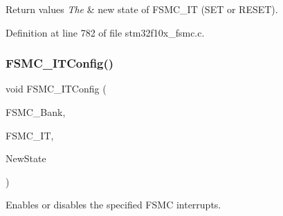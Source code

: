 \begin{DoxyRetVals}{Return values}
{\em The} & new state of F\+S\+M\+C\+\_\+\+IT (S\+ET or R\+E\+S\+ET). \\
\hline
\end{DoxyRetVals}


Definition at line 782 of file stm32f10x\+\_\+fsmc.\+c.

\mbox{\label{group___f_s_m_c___exported___functions_ga217027ae3cd213b9076b6a1be197064c}} 
\subsubsection{\texorpdfstring{F\+S\+M\+C\+\_\+\+I\+T\+Config()}{FSMC\_ITConfig()}}
{\footnotesize\ttfamily void F\+S\+M\+C\+\_\+\+I\+T\+Config (\begin{DoxyParamCaption}\item[{uint32\+\_\+t}]{F\+S\+M\+C\+\_\+\+Bank,  }\item[{uint32\+\_\+t}]{F\+S\+M\+C\+\_\+\+IT,  }\item[{\hyperlink{group___exported__types_gac9a7e9a35d2513ec15c3b537aaa4fba1}{Functional\+State}}]{New\+State }\end{DoxyParamCaption})}



Enables or disables the specified F\+S\+MC interrupts. 


